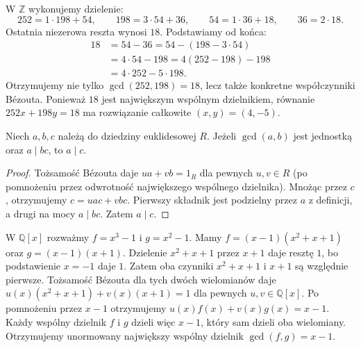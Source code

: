 \begin{przyklad}
\label{aa:prz:extended-euclid}
W $\mathbb Z$ wykonujemy dzielenie:
\[
252=1\cdot198+54,\qquad
198=3\cdot54+36,\qquad
54=1\cdot36+18,\qquad36=2\cdot18.
\]
Ostatnia niezerowa reszta wynosi $18$.
Podstawiamy od końca:
\[
\begin{aligned}
18&=54-36=54-(198-3\cdot54)\\
  &=4\cdot54-198=4(252-198)-198\\
  &=4\cdot252-5\cdot198.
\end{aligned}
\]
Otrzymujemy nie tylko $\gcd(252,198)=18$, lecz także
konkretne współczynniki Bézouta. Ponieważ $18$ jest
największym wspólnym dzielnikiem, równanie
$252x+198y=18$ ma rozwiązanie całkowite $(x,y)=(4,-5)$.
\end{przyklad}

\begin{wniosek}
\label{aa:wn:euclid-lemma}
Niech $a,b,c$ należą do dziedziny euklidesowej $R$.
Jeżeli $\gcd(a,b)$ jest jednostką oraz $a\mid bc$, to $a\mid c$.
\end{wniosek}
\begin{proof}
Tożsamość Bézouta daje $ua+vb=1_R$ dla pewnych $u,v\in R$
(po pomnożeniu przez odwrotność największego wspólnego dzielnika).
Mnożąc przez $c$, otrzymujemy $c=uac+vbc$.
Pierwszy składnik jest podzielny przez $a$ z definicji,
a drugi na mocy $a\mid bc$. Zatem $a\mid c$.
\end{proof}

\begin{przyklad}
\label{aa:prz:poly-gcd}
W $\mathbb Q[x]$ rozważmy $f=x^3-1$ i $g=x^2-1$.
Mamy $f=(x-1)(x^2+x+1)$ oraz $g=(x-1)(x+1)$.
Dzielenie $x^2+x+1$ przez $x+1$ daje resztę $1$,
bo podstawienie $x=-1$ daje $1$. Zatem oba czynniki
$x^2+x+1$ i $x+1$ są względnie pierwsze.
Tożsamość Bézouta dla tych dwóch wielomianów daje
$u(x)(x^2+x+1)+v(x)(x+1)=1$ dla pewnych $u,v\in\mathbb Q[x]$.
Po pomnożeniu przez $x-1$ otrzymujemy
$u(x)f(x)+v(x)g(x)=x-1$. Każdy wspólny dzielnik
$f$ i $g$ dzieli więc $x-1$, który sam dzieli oba wielomiany.
Otrzymujemy unormowany największy wspólny dzielnik
$\gcd(f,g)=x-1$.
\end{przyklad}

